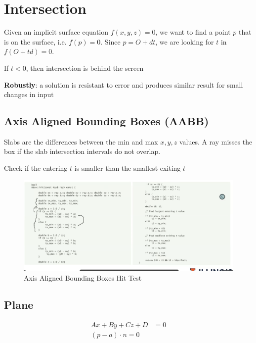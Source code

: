 \chapter{Intersection}

Given an implicit surface equation $ f\left( x, y, z \right) = 0 $, we
want to find a point $ p $ that is on the surface,
i.e. $ f\left( p \right) = 0 $. Since $ p = O + dt $, we are looking for
$ t $ in $ f\left( O + td \right) = 0 $.

If $ t < 0 $, then intersection is behind the screen

\textbf{Robustly}: a solution is resistant to error and produces similar
result for small changes in input

\section{Axis Aligned Bounding Boxes (AABB)}

  Slabs are the differences between the min and max $ x, y, z $ values.
  A ray misses the box if the slab intersection intervals do not
  overlap.

  Check if the entering $ t $ is smaller than the smallest exiting $ t $

  \begin{figure}[H]
    \centering
    \caption{Axis Aligned Bounding Boxes Hit Test}
    \includegraphics[width=\columnwidth]{images/intersection/aabb-hit-test.png}
  \end{figure}

\section{Plane}

  \begin{align}
    Ax + By + Cz + D &= 0 \\
    \left( p - a \right) \cdot n = 0
  \end{align}

